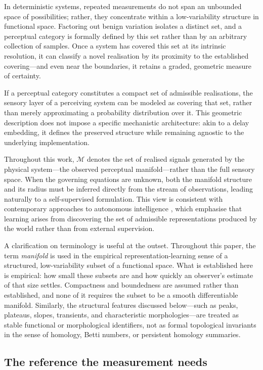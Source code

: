 \documentclass[10pt]{article}
\theoremstyle{plain}
\theoremstyle{definition}
\theoremstyle{remark}
\begin{document}
In deterministic systems, repeated measurements do not span an unbounded space of
possibilities; rather, they concentrate within a low-variability structure in
functional space. Factoring out benign variation isolates a distinct set, and a
perceptual category is formally defined by this set rather than by an arbitrary
collection of samples. Once a system has covered this set at its intrinsic
resolution, it can classify a novel realisation by its proximity to the established
covering---and even near the boundaries, it retains a graded, geometric measure of
certainty.

If a perceptual category constitutes a compact set of admissible realisations, the
sensory layer of a perceiving system can be modeled as covering that set, rather
than merely approximating a probability distribution over it. This geometric
description does not impose a specific mechanistic architecture: akin to a delay
embedding, it defines the preserved structure while remaining agnostic
to the underlying implementation.

Throughout this work, $\mathcal{M}$ denotes the set of realised signals
generated by the physical system---the observed perceptual manifold---rather
than the full sensory space.
When the governing equations are unknown, both the manifold structure and its
radius must be inferred directly from the stream of observations, leading
naturally to a self-supervised formulation.
This view is consistent with contemporary approaches to autonomous intelligence
\citep{lecun2022path}, which emphasise that learning arises from discovering the
set of admissible representations produced by the world rather than from
external supervision.

A clarification on terminology is useful at the outset. Throughout this paper,
the term \emph{manifold} is used in the empirical representation-learning
sense of a structured, low-variability subset of a functional space. What is
established here is empirical: how small these subsets are and how quickly an
observer's estimate of that size settles. Compactness and boundedness are
assumed rather than established, and none of it requires the subset to be a
smooth differentiable manifold. Similarly, the structural features discussed
below---such as peaks, plateaus, slopes, transients, and characteristic
morphologies---are treated as stable functional or morphological identifiers,
not as formal topological invariants in the sense of homology, Betti numbers,
or persistent homology summaries.

\subsection{The reference the measurement needs}
\end{document}
